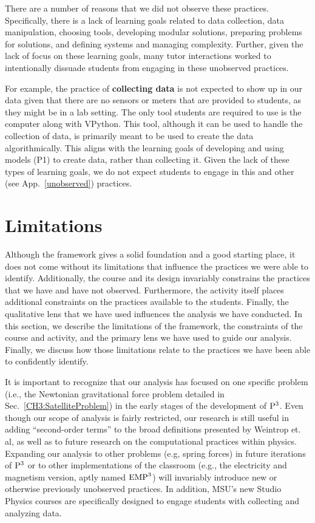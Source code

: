 \documentclass{msuphddissertation}
\begin{document}
\begin{doublespace}
There are a number of reasons that we did not observe these practices.  Specifically, there is a lack of learning goals related to data collection, data manipulation, choosing tools, developing modular solutions, preparing problems for solutions, and defining systems and managing complexity.  Further, given the lack of focus on these learning goals, many tutor interactions worked to intentionally dissuade students from engaging in these unobserved practices.

For example, the practice of \textbf{collecting data} is not expected to show up in our data given that there are no sensors or meters that are provided to students, as they might be in a lab setting.  The only tool students are required to use is the computer along with VPython.  This tool, although it can be used to handle the collection of data, is primarily meant to be used to create the data algorithmically.  This aligns with the learning goals of developing and using models (P1) to create data, rather than collecting it.  Given the lack of these types of learning goals, we do not expect students to engage in this and other (see App.~\ref{unobserved}) practices.

\section{Limitations}

Although the framework gives a solid foundation and a good starting place, it does not come without its limitations that influence the practices we were able to identify.  Additionally, the course and its design invariably constrains the practices that we have and have not observed.  Furthermore, the activity itself places additional constraints on the practices available to the students.  Finally, the qualitative lens that we have used influences the analysis we have conducted.  In this section, we describe the limitations of the framework, the constraints of the course and activity, and the primary lens we have used to guide our analysis.  Finally, we discuss how those limitations relate to the practices we have been able to confidently identify.

It is important to recognize that our analysis has focused on one specific problem (i.e., the Newtonian gravitational force problem detailed in Sec.~\ref{CH3:SatelliteProblem}) in the early stages of the development of ${\rm P}^{3}$.  Even though our scope of analysis is fairly restricted, our research is still useful in adding ``second-order terms'' to the broad definitions presented by Weintrop et. al, as well as to future research on the computational practices within physics.  Expanding our analysis to other problems (e.g, spring forces) in future iterations of ${\rm P}^{3}$ or to other implementations of the classroom (e.g., the electricity and magnetism version, aptly named ${\rm EMP}^{3}$) will invariably introduce new or otherwise previously unobserved practices.  In addition, MSU's new Studio Physics courses are specifically designed to engage students with collecting and analyzing data.


\end{doublespace}
\end{document}
